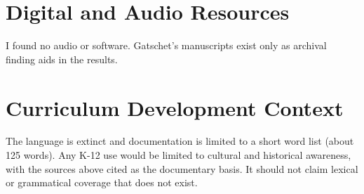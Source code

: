 \documentclass[12pt]{article}
\begin{document}
\section{Digital and Audio Resources}
I found no audio or software. Gatschet's manuscripts exist only as archival finding aids in the results.

\section{Curriculum Development Context}
The language is extinct and documentation is limited to a short word list (about 125 words). Any K-12 use would be limited to cultural and historical awareness, with the sources above cited as the documentary basis. It should not claim lexical or grammatical coverage that does not exist.
\end{document}
